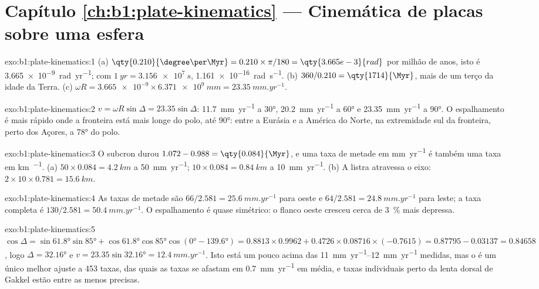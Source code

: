 \section*{Capítulo \ref{ch:b1:plate-kinematics} --- Cinemática de placas sobre uma esfera}

\begin{solution}{exo:b1:plate-kinematics:1}
(a) $\qty{0.210}{\degree\per\Myr} = 0.210\times\pi/180 = \qty{3.665e-3}{rad}$
por milhão de anos, isto é \qty{3.665e-9}{rad.yr^{-1}}; com
$\qty{1}{yr} = \qty{3.156e7}{s}$, \qty{1.161e-16}{rad.s^{-1}}. (b) $360/0.210 =
\qty{1714}{\Myr}$, mais de um terço da idade da Terra. (c) $\omega R =
\num{3.665e-9}\times\qty{6.371e9}{mm} = \qty{23.35}{mm.yr^{-1}}$.
\end{solution}

\begin{solution}{exo:b1:plate-kinematics:2}
$v = \omega R\sin\Delta = 23.35\sin\Delta$: \qty{11.7}{mm.yr^{-1}} a \ang{30},
\qty{20.2}{mm.yr^{-1}} a \ang{60} e \qty{23.35}{mm.yr^{-1}} a \ang{90}. O
espalhamento é mais rápido onde a fronteira está mais longe do polo, até
\ang{90}: entre a Eurásia e a América do Norte, na extremidade sul da
fronteira, perto dos Açores, a \ang{78} do polo.
\end{solution}

\begin{solution}{exo:b1:plate-kinematics:3}
O subcron durou $1.072 - 0.988 = \qty{0.084}{\Myr}$, e uma taxa de metade em
\unit{mm.yr^{-1}} é também uma taxa em \unit{km\per\Myr}. (a) $50\times0.084 =
\qty{4.2}{km}$ a \qty{50}{mm.yr^{-1}}; $10\times0.084 = \qty{0.84}{km}$ a
\qty{10}{mm.yr^{-1}}. (b) A listra atravessa o eixo:
$2\times10\times0.781 = \qty{15.6}{km}$.
\end{solution}

\begin{solution}{exo:b1:plate-kinematics:4}
As taxas de metade são $66/2.581 = \qty{25.6}{mm.yr^{-1}}$ para oeste e
$64/2.581 = \qty{24.8}{mm.yr^{-1}}$ para leste; a taxa completa é
$130/2.581 = \qty{50.4}{mm.yr^{-1}}$. O
espalhamento é quase simétrico: o flanco oeste cresceu cerca de
\qty{3}{\percent} mais depressa.
\end{solution}

\begin{solution}{exo:b1:plate-kinematics:5}
$\cos\Delta = \sin\ang{61.8}\sin\ang{85} + \cos\ang{61.8}\cos\ang{85}
\cos(\ang{0} - \ang{139.6}) = 0.8813\times0.9962 + 0.4726\times0.08716\times
(-0.7615) = 0.87795 - 0.03137 = 0.84658$, logo $\Delta = \ang{32.16}$ e
$v = 23.35\sin\ang{32.16} = \qty{12.4}{mm.yr^{-1}}$. Isto está um pouco acima das
\qtyrange{11}{12}{mm.yr^{-1}} medidas, mas o  é um único melhor
ajuste a 453 taxas, das quais as taxas se afastam em \qty{0.7}{mm.yr^{-1}} em
média, e taxas individuais perto da lenta dorsal de Gakkel estão entre as menos
precisas.
\end{solution}

